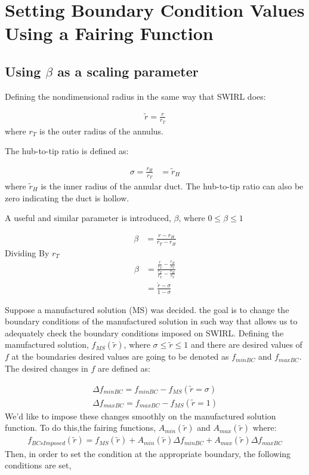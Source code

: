 
\section{Setting Boundary Condition Values Using a Fairing Function}
\subsection{Using $\beta$ as a scaling parameter}
Defining the nondimensional radius in the same way that SWIRL does:

\begin{align*}
    \widetilde{r} = \frac{r}{r_T}
\end{align*}
where $r_T$ is the outer radius of the annulus.

The hub-to-tip ratio is defined as:

\begin{align*}
    \sigma = \frac{r_H}{r_T}
     &= \widetilde{r}_H
\end{align*}
where $\widetilde{r}_H$ is the inner radius of the annular duct. The hub-to-tip
ratio can also be zero indicating the duct is hollow.

A useful and similar parameter is introduced, $\beta$, where $ 0 \leq \beta \leq 1$

\begin{align*}
    \beta &=
    \frac{r - r_H}{r_T - r_H}
\end{align*}
Dividing By $r_T$
\begin{align*}
    \beta &= 
    \frac{
        \frac{r}{r_T} - \frac{r_H}{r_T}
}{
        \frac{r_T}{r_T} - \frac{r_H}{r_T}
}\\
&= \frac{
    \widetilde{r} - \sigma 
}{
1 - \sigma
}
\end{align*}

Suppose a manufactured solution (MS) was decided. the goal is to change the
boundary conditions of the manufactured solution in such  way that allows us 
to adequately check the boundary conditions imposed on SWIRL. Defining the 
manufactured solution, $f_{MS}(\widetilde{r})$,   where
$\sigma \leq \widetilde{r} \leq 1$ and there are desired values of $f$ at the 
boundaries desired values are going to be denoted as $f_{minBC}$ and $f_{maxBC}$.
The desired changes in $f$ are defined as:

\begin{align*}
    \Delta f_{minBC} = f_{minBC} - f_{MS}(\widetilde{r} = \sigma)\\
    \Delta f_{maxBC} = f_{maxBC} - f_{MS}(\widetilde{r} = 1) 
\end{align*}
We'd like to impose these changes smoothly on the manufactured solution function.
To do this,the fairing functions, $A_{min}(\widetilde{r})$ and $A_{max}(\widetilde{r})$
where:
\begin{align*}
    f_{BCsImposed}(\widetilde{r}) = f_{MS}(\widetilde{r}) +
    A_{min}(\widetilde{r}) \Delta f_{minBC}  +  
    A_{max}(\widetilde{r}) \Delta f_{maxBC}  
\end{align*}
Then, in order to set the condition at the appropriate boundary, the following 
conditions are set,


